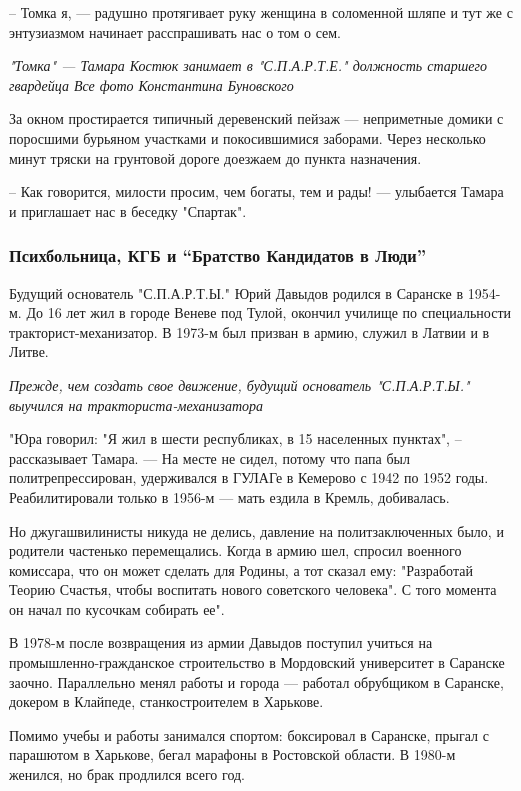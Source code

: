 – Томка я, --- радушно протягивает руку женщина в соломенной шляпе и тут же с
энтузиазмом начинает расспрашивать нас о том о сем.
  
\emph{"Томка" --- Тамара Костюк занимает в "С.П.А.Р.Т.Е." должность старшего гвардейца
Все фото Константина Буновского}

За окном простирается типичный деревенский пейзаж --- неприметные домики с
поросшими бурьяном участками и покосившимися заборами. Через несколько минут
тряски на грунтовой дороге доезжаем до пункта назначения.

– Как говорится, милости просим, чем богаты, тем и рады! --- улыбается Тамара и
приглашает нас в беседку "Спартак".

\subsubsection{Психбольница, КГБ и ``Братство Кандидатов в Люди''}

Будущий основатель "С.П.А.Р.Т.Ы." Юрий Давыдов родился в Саранске в 1954-м. До
16 лет жил в городе Веневе под Тулой, окончил училище по специальности
тракторист-механизатор. В 1973-м был призван в армию, служил в Латвии и в
Литве.

{\em
Прежде, чем создать свое движение, будущий основатель "С.П.А.Р.Т.Ы." выучился на тракториста-механизатора
\/}

"Юра говорил: "Я жил в шести республиках, в 15 населенных пунктах", –
рассказывает Тамара. --- На месте не сидел, потому что папа был
политрепрессирован, удерживался в ГУЛАГе в Кемерово с 1942 по 1952 годы.
Реабилитировали только в 1956-м --- мать ездила в Кремль, добивалась. 

Но джугашвилинисты никуда не делись, давление на политзаключенных было, и
родители частенько перемещались. Когда в армию шел, спросил военного комиссара,
что он может сделать для Родины, а тот сказал ему: "Разработай Теорию Счастья,
чтобы воспитать нового советского человека". С того момента он начал по
кусочкам собирать ее".

В 1978-м после возвращения из армии Давыдов поступил учиться на
промышленно-гражданское строительство в Мордовский университет в Саранске
заочно. Параллельно менял работы и города --- работал обрубщиком в Саранске,
докером в Клайпеде, станкостроителем в Харькове. 

Помимо учебы и работы занимался спортом: боксировал в Саранске, прыгал с
парашютом в Харькове, бегал марафоны в Ростовской области. В 1980-м женился, но
брак продлился всего год.

